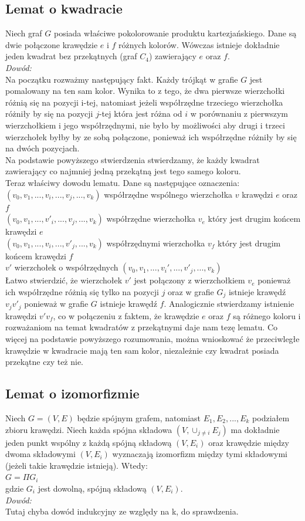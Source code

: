 \documentclass[12pt,a4paper,titlepage]{article}
\begin{document}
\subsection{Lemat o kwadracie}
Niech graf $G$ posiada właściwe pokolorowanie produktu kartezjańskiego. Dane są dwie połączone krawędzie $e$ i $f$ różnych kolorów. Wówczas istnieje dokładnie jeden kwadrat bez przekątnych (graf $C_4$) zawierający $e$ oraz $f$.\\
\textit{Dowód:}\\
Na początku rozważmy następujący fakt. Każdy trójkąt w grafie $G$ jest pomalowany na ten sam kolor. Wynika to z tego, że dwa pierwsze wierzchołki różnią się na pozycji i-tej, natomiast jeżeli współrzędne trzeciego wierzchołka różniły by się na pozycji $j$-tej która jest różna od $i$ w porównaniu z pierwszym wierzchołkiem i jego współrzędnymi, nie było by możliwości aby drugi i trzeci wierzchołek byłby by ze sobą połączone, ponieważ ich współrzędne różniły by się na dwóch pozycjach.\\
Na podstawie powyższego stwierdzenia stwierdzamy, że każdy kwadrat zawierający co najmniej jedną przekątną jest tego samego koloru.\\
Teraz właściwy dowodu lematu. Dane są następujące oznaczenia:\\
$(v_0 , v_1, ... ,v_i, ..., v_j,...,v_k )$ współrzędne wspólnego wierzchołka $v$ krawędzi $e$ oraz $f$\\
$(v_0 , v_1, ... ,v'_i, ..., v_j,...,v_k )$ współrzędne wierzchołka $v_e$ który jest drugim końcem krawędzi $e$\\
$(v_0 , v_1, ... ,v_i, ..., v'_j,...,v_k )$ współrzędnymi wierzchołka $v_f$ który jest drugim końcem krawędzi $f$\\
$v'$ wierzchołek o współrzędnych $(v_0 , v_1, ... ,v_i', ..., v'_j,...,v_k )$\\ 
Łatwo stwierdzić, że wierzchołek $v'$ jest połączony z wierzchołkiem $v_e$ ponieważ ich współrzędne różnią się tylko na pozycji $j$ oraz w grafie $G_j$ istnieje krawędź $v_j v'_j$ ponieważ w grafie $G$ istnieje krawędź $f$. Analogicznie stwierdzamy istnienie krawędzi $v'v_f$, co w połączeniu z faktem, że krawędzie $e$ oraz $f$ są różnego koloru i rozważaniom na temat kwadratów z przekątnymi daje nam tezę lematu. Co więcej na podstawie powyższego rozumowania, można wnioskować że przeciwległe krawędzie w kwadracie mają ten sam kolor, niezależnie czy kwadrat posiada przekątne czy też nie.
\subsection{Lemat o izomorfizmie}
Niech $G=(V, E)$ będzie spójnym grafem, natomiast $E_1 , E_2 , ... , E_k$ podziałem zbioru krawędzi. Niech każda spójna składowa $(V, \cup_{j \neq i}E_j)$ ma dokładnie jeden punkt wspólny z każdą spójną składową $(V, E_i)$ oraz krawędzie między dwoma składowymi $(V, E_i)$ wyznaczają izomorfizm między tymi składowymi (jeżeli takie krawędzie istnieją). Wtedy:\\
$G=\Pi G_i $ \\
gdzie $G_i $ jest dowolną, spójną składową $(V, E_i)$.\\
\textit{Dowód:}\\
Tutaj chyba dowód indukcyjny ze względy na k, do sprawdzenia. 
\end{document}
